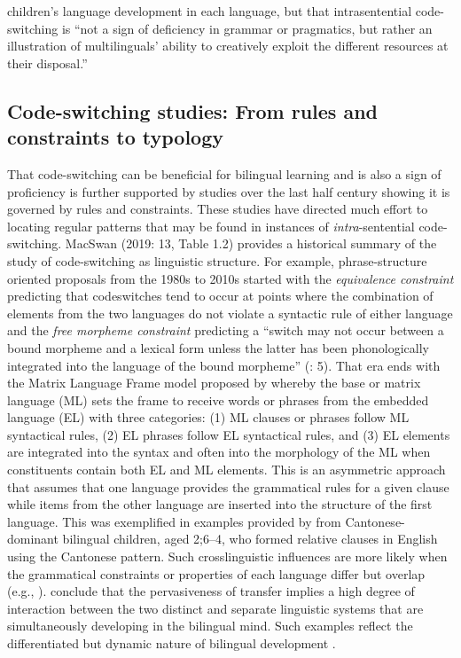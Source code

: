 \documentclass[output=paper,colorlinks,citecolor=brown]{langscibook}
\begin{document}
children’s language development in each language, but that intrasentential code-switching is “not a sign of deficiency in grammar or pragmatics, but rather an illustration of multilinguals’ ability to creatively exploit the different resources at their disposal.” 

\subsection{Code-switching studies: From rules and constraints to typology}\label{sec:quay:2.1}

That code-switching can be beneficial for bilingual learning and is also a sign of proficiency is further supported by studies over the last half century showing it is governed by rules and constraints. These studies have directed much effort to locating regular patterns that may be found in instances of \textit{intra}{}-sentential code-switching. MacSwan (2019: 13, Table 1.2) provides a historical summary of the study of code-switching as linguistic structure. For example, phrase-structure oriented proposals from the 1980s to 2010s started with the \textit{equivalence constraint} predicting that codeswitches tend to occur at points where the combination of elements from the two languages do not violate a syntactic rule of either language and the \textit{free morpheme constraint} predicting a “switch may not occur between a bound morpheme and a lexical form unless the latter has been phonologically integrated into the language of the bound morpheme” (\citealt{SankoffPoplack1981}: 5). That era ends with the Matrix Language Frame model proposed by \citet{Myers-Scotton1993duelling} whereby the base or matrix language (ML) sets the frame to receive words or phrases from the embedded language (EL) with three categories: 
(1) ML clauses or phrases follow ML syntactical rules, 
(2) EL phrases follow EL syntactical rules, and 
(3) EL elements are integrated into the syntax and often into the morphology of the ML when constituents contain both EL and ML elements. This is an asymmetric approach that assumes that one language provides the grammatical rules for a given clause while items from the other language are inserted into the structure of the first language. This was exemplified in examples provided by \citet{YipMatthews2007} from Cantonese-dominant bilingual children, aged 2;6–4, who formed relative clauses in English using the Cantonese pattern. Such crosslinguistic influences are more likely when the grammatical constraints or properties of each language differ but overlap (e.g., \citealt{HulkMüller2000}). \citet{YipMatthews2000} conclude that the pervasiveness of transfer implies a high degree of interaction between the two distinct and separate linguistic systems that are simultaneously developing in the bilingual mind. Such examples reflect the differentiated but dynamic nature of bilingual development \citep{Genesee2022}.
\end{document}
